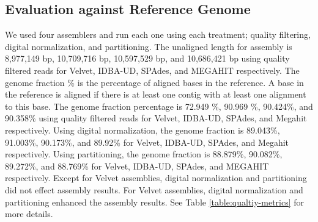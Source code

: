 
\subsection*{Evaluation against Reference Genome}   

We used four assemblers and run each one using each treatment; quality
filtering, digital normalization, and partitioning.  The unaligned
length for assembly is 8,977,149 bp, 10,709,716 bp, 10,597,529 bp, and
10,686,421 bp using quality filtered reads for Velvet, IDBA-UD, SPAdes,
and MEGAHIT respectively.  The genome fraction \% is the percentage of
aligned bases in the reference. A base in the reference is aligned if
there is at least one contig with at least one alignment to this base.
The genome fraction percentage is 72.949 \%, 90.969 \%, 90.424\%, and
90.358\% using quality filtered reads for Velvet, IDBA-UD, SPAdes, and
Megahit respectively.  Using digital normalization, the genome
fraction is 89.043\%, 91.003\%, 90.173\%, and 89.92\% for Velvet,
IDBA-UD, SPAdes, and Megahit respectively.  Using partitioning, the
genome fraction is 88.879\%, 90.082\%, 89.272\%, and 88.769\% for
Velvet, IDBA-UD, SPAdes, and MEGAHIT respectively.  Except for Velvet assemblies, digital
normalization and partitioning did not effect assembly results. For Velvet assemblies, digital normalization and partitioning enhanced the assembly results. See
Table \ref{table:qualtiy-metrics} for more details.




